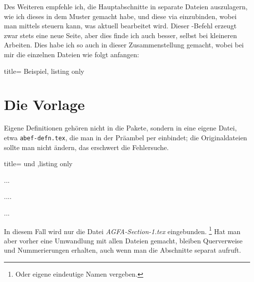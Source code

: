 Des Weiteren empfehle ich, die Hauptabschnitte in separate Dateien auszulagern, wie ich dieses in dem Muster gemacht habe, und diese via  einzubinden, wobei man mittels  steuern kann, was aktuell bearbeitet wird.
Dieser -Befehl erzeugt zwar stets eine neue Seite, aber dies finde ich auch besser, selbst bei kleineren Arbeiten.
Dies habe ich so auch in dieser Zusammenstellung gemacht, wobei bei mir die einzelnen Dateien wie folgt anfangen:
%
\begin{tcblisting}{title= Beispiel, listing only}
\thispagestyle{empty}
\section{Die Vorlage}\label{sec:section1}
\end{tcblisting}
Eigene Definitionen gehören nicht in die Pakete, sondern in eine eigene Datei, etwa \texttt{abef-defn.tex}, die man in der Präambel per  einbindet; die Originaldateien sollte man nicht ändern, das erschwert die Fehlersuche.
%
\begin{tcblisting}{title=  und ,listing only}

...

....
	
	
...
\end{tcblisting}
%
In diesem Fall wird nur die Datei \emph{AGFA-Section-1.tex} eingebunden.%
\footnote{Oder eigene eindeutige Namen vergeben.}
Hat man aber vorher eine Umwandlung mit allen Dateien gemacht, bleiben Querverweise und Nummerierungen erhalten, auch wenn man die Abschnitte separat aufruft.
